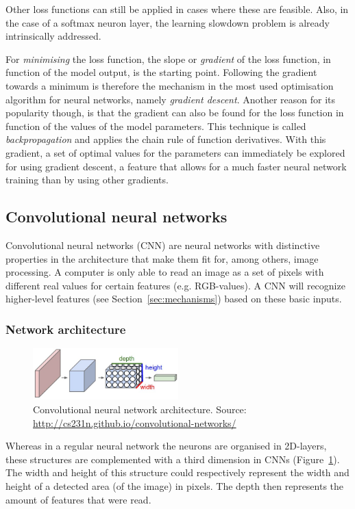 Other loss functions can still be applied in cases where these are feasible. Also, in the case of a softmax neuron layer, the learning slowdown problem is already intrinsically addressed.


For \textit{minimising} the loss function, the slope or \textit{gradient} of the loss function, in function of the model output, is the starting point. Following the gradient towards a minimum is therefore the mechanism in the most used optimisation algorithm for neural networks, namely \textit{gradient descent}. Another reason for its popularity though, is that the gradient can also be found for the loss function in function of the values of the model parameters. This technique is called \textit{backpropagation} and applies the chain rule of function derivatives. With this gradient, a set of optimal values for the parameters can immediately be explored for using gradient descent, a feature that allows for a much faster neural network training than by using other gradients.

\subsection{Convolutional neural networks \label{subsec:cnn}}

Convolutional neural networks (CNN) are neural networks with distinctive properties in the architecture that make them fit for, among others, image processing. A computer is only able to read an image as a set of pixels with different real values for certain features (e.g. RGB-values). A CNN will recognize higher-level features (see Section~\ref{sec:mechanisms}) based on these basic inputs.
\subsubsection{Network architecture \label{subsubsec:convarchi}}
\begin{figure}
	\includegraphics[width=0.5\textwidth]{../figures/cnn_archi}
	\caption{Convolutional neural network architecture. Source: \url{http://cs231n.github.io/convolutional-networks/}\label{fig:cnnArchi}}
\end{figure}
Whereas in a regular neural network the neurons are organised in 2D-layers, these structures are complemented with a third dimension in CNNs (Figure~\ref{fig:cnnArchi}). The width and height of this structure could respectively represent the width and height of a detected area (of the image) in pixels. The depth then represents the amount of features that were read.

